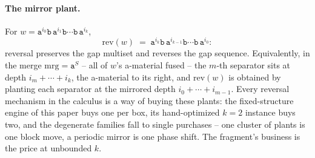 \paragraph{The mirror plant.}
For $w = \mathtt a^{i_0}\mathtt b\,\mathtt a^{i_1}\mathtt b\cdots
\mathtt b\,\mathtt a^{i_k}$,
\begin{equation*}
    \mathrm{rev}(w) \;=\; \mathtt a^{i_k}\mathtt b\,
    \mathtt a^{i_{k-1}}\mathtt b\cdots \mathtt b\,\mathtt a^{i_0}:
\end{equation*}
reversal preserves the gap multiset and reverses the gap sequence.
Equivalently, in the merge $\mathrm{mrg} = \mathtt a^{S}$ -- all of
$w$'s a-material fused -- the $m$-th separator sits at depth
$i_m + \cdots + i_k$, the a-material to its right, and
$\mathrm{rev}(w)$ is obtained by planting each separator at the
mirrored depth $i_0 + \cdots + i_{m-1}$.  Every reversal mechanism in
the calculus is a way of buying these plants: the fixed-structure
engine of this paper buys one per box, its hand-optimized $k = 2$
instance buys two, and the degenerate families fall to single
purchases -- one cluster of plants is one block move, a periodic
mirror is one phase shift.  The fragment's business is the price at
unbounded $k$.

